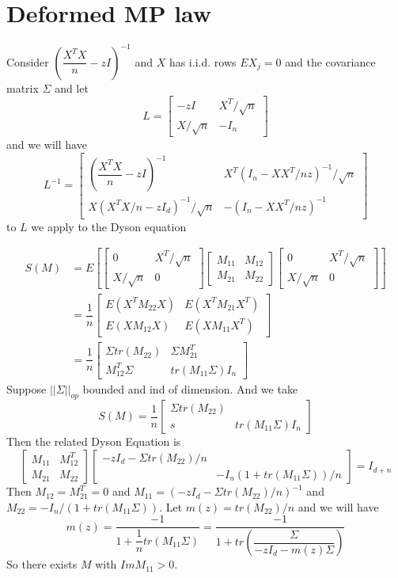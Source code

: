 \documentclass[lang=en, color=blue, ]{elegantbook}
\begin{document}
\section{Deformed MP law}
Consider $(\dfrac{X^TX}{n} - zI)^{-1}$ and $X$ has i.i.d. rows $EX_j = 0$ and the covariance matrix $\Sigma$ and let
\[
L = \left[\begin{array}{cc} -zI & X^T/\sqrt{n} \\ X/\sqrt{n} & -I_n\end{array}\right]
\]
and we will have
\[
L^{-1} = \left[\begin{array}{cc} (\dfrac{X^TX}{n} - zI)^{-1} & X^T(I_n- XX^T/nz)^{-1}/\sqrt{n} \\ X(X^TX/n-zI_d)^{-1}/\sqrt{n} & -(I_n-XX^T/nz)^{-1}\end{array}\right]
\]
to $L$ we apply to the Dyson equation\par
\[
\begin{aligned}
S(M) &= E\left[\left[\begin{array}{cc} 0 & X^T/\sqrt{n} \\ X/\sqrt{n} & 0\end{array}\right]\left[\begin{array}{cc} M_{11} & M_{12} \\ M_{21} & M_{22}\end{array}\right]\left[\begin{array}{cc} 0 & X^T/\sqrt{n} \\ X/\sqrt{n} & 0\end{array}\right]\right] \\
& = \dfrac{1}{n} \left[\begin{array}{cc} E(X^TM_{22} X) & E(X^TM_{21} X^T) \\ E(XM_{12} X) & E(XM_{11} X^T)\end{array}\right] \\
& = \dfrac{1}{n} \left[\begin{array}{cc} \Sigma tr(M_{22}) & \Sigma M_{21}^T \\ M_{12}^T\Sigma & tr(M_{11}\Sigma)I_n\end{array}\right]
\end{aligned}
\]
Suppose $||\Sigma||_{op}$ bounded and ind of dimension. And we take
\[S(M ) = \dfrac{1}{n} \left[\begin{array}{cc} \Sigma tr(M_{22}) &  \\ s & tr(M_{11}\Sigma)I_n\end{array}\right]\]
Then the related Dyson Equation is 
\[
\left[\begin{array}{cc} M_{11} & M_{12}^T \\ M_{21} & M_{22}\end{array}\right]\left[\begin{array}{cc} -zI_d - \Sigma tr(M_{22})/n &  \\  & -I_n(1+tr(M_{11}\Sigma))/n\end{array}\right] = I_{d+n}
\]
Then $M_{12} = M_{21}^T = 0$ and $M_11 = (-zI_d - \Sigma tr(M_22)/n)^{-1}$ and $M_22 = -I_n/(1+tr(M_11 \Sigma))$. Let $m(z) = tr(M_22)/n$
and we will have
\[m(z) = \dfrac{-1}{1+\dfrac{1}{n}tr(M_{11}\Sigma)} = \dfrac{-1}{1+tr\left(\dfrac{\Sigma}{-zI_d - m(z)\Sigma}\right)}\] 
So there exists $M$ with $Im M_{11} > 0$.
\end{document}
